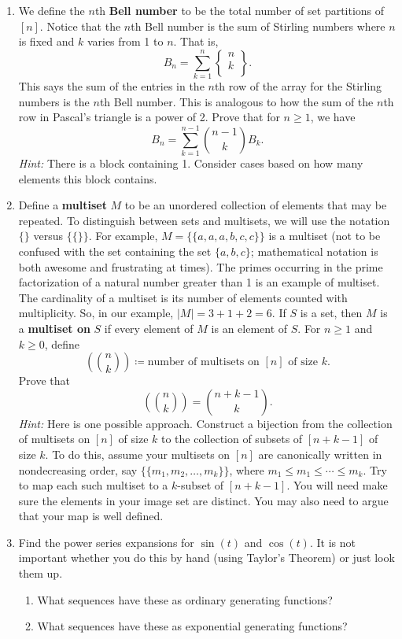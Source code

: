 \documentclass[11pt]{article}%
\theoremstyle{definition}
\newcommand{\stirling}[2]{
  \displaystyle \left\{\begin{matrix}#1  \\#2  \\ \end{matrix}\right\}}
\begin{document}
\begin{enumerate}
\item We define the $n$th \textbf{Bell number} to be the total number of set partitions of $[n]$.  Notice that the $n$th Bell number is the sum of Stirling numbers where $n$ is fixed and $k$ varies from 1 to $n$.  That is,
\[
B_n=\sum_{k=1}^n\stirling{n}{k}.
\]
This says the sum of the entries in the $n$th row of the array for the Stirling numbers is the $n$th Bell number.  This is analogous to how the sum of the $n$th row in Pascal's triangle is a power of 2. Prove that for $n\geq 1$, we have
\[
B_n=\sum_{k=1}^{n-1}\binom{n-1}{k}B_k.
\]
\emph{Hint:} There is a block containing 1. Consider cases based on how many elements this block contains.
\item Define a \textbf{multiset} $M$ to be an unordered collection of elements that may be repeated.  To distinguish between sets and multisets, we will use the notation $\{\}$ versus $\{\{\}\}$. For example, $M=\{\{a,a,a,b,c,c\}\}$ is a multiset (not to be confused with the set containing the set $\{a,b,c\}$; mathematical notation is both awesome and frustrating at times). The primes occurring in the prime factorization of a natural number greater than 1 is an example of multiset.  The cardinality of a multiset is its number of elements counted with multiplicity.  So, in our example, $|M|=3+1+2=6$.  If $S$ is a set, then $M$ is a \textbf{multiset on} $S$ if every element of $M$ is an element of $S$. For $n\geq 1$ and $k\geq 0$, define
\[
\left(\binom{n}{k}\right)\coloneqq \text{number of multisets on }[n]\text{ of size }k.
\]
Prove that
\[
\left(\binom{n}{k}\right)=\binom{n+k-1}{k}.
\]
\emph{Hint:} Here is one possible approach.  Construct a bijection from the collection of multisets on $[n]$ of size $k$ to the collection of subsets of $[n+k-1]$ of size $k$. To do this, assume your multisets on $[n]$ are canonically written in nondecreasing order, say $\{\{m_1,m_2,\ldots,m_k\}\}$, where $m_1\leq m_1\leq \cdots \leq m_k$.  Try to map each such multiset to a $k$-subset of $[n+k-1]$.  You will need make sure the elements in your image set are distinct.  You may also need to argue that your map is well defined.

\item Find the power series expansions for $\sin(t)$ and $\cos(t)$. It is not important whether you do this by hand (using Taylor's Theorem) or just look them up.  
\begin{enumerate}
\item What sequences have these as ordinary generating functions?
\item What sequences have these as exponential generating functions?
\end{enumerate}


\end{enumerate}
\end{document}
